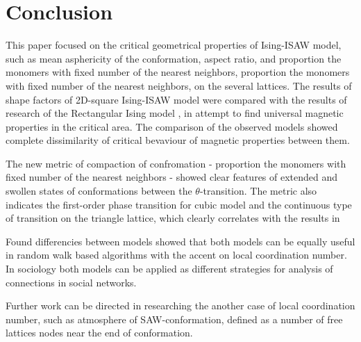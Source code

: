 \section{Conclusion}
\label{sec:end}
This paper focused on the critical geometrical properties of Ising-ISAW model, such as mean asphericity of the conformation, aspect ratio, and proportion the monomers with fixed number of the nearest neighbors, proportion the monomers with fixed number of the nearest neighbors, on the several lattices. 
The results of shape factors of 2D-square Ising-ISAW model were compared with the results of research of the Rectangular Ising model \cite{Selke2006}, in attempt to find universal magnetic properties in the critical area. 
The comparison of the observed models showed complete dissimilarity of critical bevaviour of magnetic properties between them.

The new metric of compaction of confromation - proportion the monomers with fixed number of the nearest neighbors - showed clear features of extended and swollen states of conformations between the $\theta$-transition. 
The metric also indicates the first-order phase transition for cubic model and the continuous type of transition on the triangle lattice, which clearly correlates with the results in \cite{Foster2021, faizullina2021critical}

Found differencies between models showed that both models can be equally useful in random walk based algorithms with the accent on local coordination number. 
In sociology both models can be applied as different strategies for analysis of connections in social networks.

Further work can be directed in researching the another case of local coordination number, such as atmosphere of SAW-conformation, defined as a number of free lattices nodes near the end of conformation.
